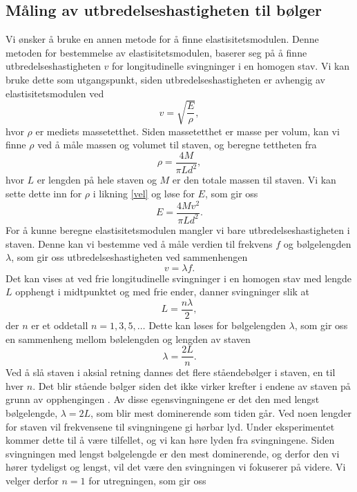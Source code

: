 \documentclass[%
 reprint,
 amsmath,amssymb,
 aps,
 norsk,
 booktabs
]{revtex4-1}
\begin{document}
\subsection{Måling av utbredelseshastigheten til bølger}\label{teori-b}
Vi ønsker å bruke en annen metode for å finne elastisitetsmodulen. Denne metoden for bestemmelse av elastisitetsmodulen, baserer seg på å finne utbredelseshastigheten $v$ for longitudinelle svingninger i en homogen stav. Vi kan bruke dette som utgangspunkt, siden utbredelseshastigheten er avhengig av elastisitetsmodulen ved
\begin{equation}
  v = \sqrt{\frac{E}{\rho}},\label{vel}
\end{equation}
hvor $\rho$ er mediets massetetthet. Siden massetetthet er masse per volum, kan vi finne $\rho$ ved å måle massen og volumet til staven, og beregne tettheten fra
\begin{equation*}
  \rho = \frac{4M}{\pi L d^2},
\end{equation*}
hvor $L$ er lengden på hele staven og $M$ er den totale massen til staven. Vi kan sette dette inn for $\rho$ i likning \eqref{vel} og løse for $E$, som gir oss
\begin{equation}
  E = \frac{4Mv^2}{\pi L d^2}.\label{elast}
\end{equation}
For å kunne beregne elastisitetsmodulen mangler vi bare utbredelseshastigheten i staven. Denne kan vi bestemme ved å måle verdien til frekvens $f$ og bølgelengden $\lambda$, som gir oss utbredelseshastigheten ved sammenhengen
\begin{equation}
  v = \lambda f.\label{vlf}
\end{equation}
Det kan vises \cite{oppgave} at ved frie longitudinelle svingninger i en homogen stav med lengde $L$ opphengt i midtpunktet og med frie ender, danner svingninger slik at
\begin{equation*}
  L = \frac{n\lambda}{2},
\end{equation*}
der $n$ er et oddetall $n = 1, 3, 5, \ldots$ Dette kan løses for bølgelengden $\lambda$, som gir oss en sammenheng mellom bølelengden og lengden av staven
\begin{equation*}
  \lambda = \frac{2L}{n}.
\end{equation*}
Ved å slå staven i aksial retning dannes det flere ståendebølger i staven, en til hver $n$. Det blir stående bølger siden det ikke virker krefter i endene av staven på grunn av opphengingen \cite{oppgave}. Av disse egensvingningene er det den med lengst bølgelengde, $\lambda = 2L$, som blir mest dominerende som tiden går. Ved noen lengder for staven vil frekvensene til svingningene gi hørbar lyd. Under eksperimentet kommer dette til å være tilfellet, og vi kan høre lyden fra svingningene. Siden svingningen med lengst bølgelengde er den mest dominerende, og derfor den vi hører tydeligst og lengst, vil det være den svingningen vi fokuserer på videre. Vi velger derfor $n=1$ for utregningen, som gir oss
\end{document}
